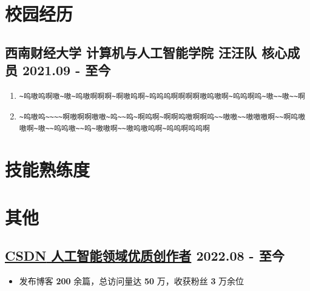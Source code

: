 \documentclass{resume}
\begin{document}
\section[校园经历]{ \textbf{\color{mainColor}校园经历}}

\subsection[汪汪队 核心成员]{\textbf{西南财经大学} \textbf{计算机与人工智能学院} \textbf{汪汪队} \quad 核心成员 \hfill {\small 2021.09 - 至今}}

\begin{enumerate}
    \item \lstinline|~呜嗷呜啊嗷~嗷~呜嗷啊啊啊~啊嗷呜啊~呜呜呜啊啊啊啊嗷呜嗷啊~呜呜啊呜~嗷~~嗷~~啊|
    \item \lstinline|~呜嗷呜~~~~啊嗷啊啊嗷嗷~呜~~呜~啊呜啊~啊啊呜嗷啊啊呜~~嗷嗷~~嗷嗷嗷啊~~啊呜嗷嗷啊~嗷~~呜呜嗷~~呜~嗷嗷啊~~嗷呜嗷呜啊~呜呜啊呜呜啊|
\end{enumerate}
\section[技能熟练度]{ \textbf{\color{mainColor}技能熟练度}}

\begin{minipage}{0.28\textwidth}
 \vspace{-2pt}
\end{minipage}
\hfill
\begin{minipage}{0.28\textwidth}
 \vspace{-2pt}
\end{minipage}
\hfill
\begin{minipage}{0.28\textwidth}
 \vspace{-2pt}
\end{minipage}
\section[其他]{ \textbf{\color{mainColor}其他}}

\subsection[CSDN 人工智能领域优质创作者]{\href{https://marquis.blog.csdn.net/}{\textbf{CSDN} \quad 人工智能领域优质创作者} \hfill {\small 2022.08 - 至今}}

\begin{itemize}
    \item 发布博客 \textbf{200} 余篇，总访问量达 \textbf{50} 万，收获粉丝 \textbf{3} 万余位
\end{itemize}
\end{document}
